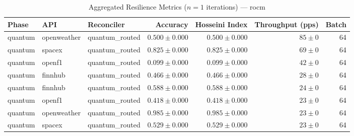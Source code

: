 
\begin{table}[htbp]
\caption{Aggregated Resilience Metrics ($n=1$ iterations) --- rocm}
\begin{tabular}{l l l r r r r}
\hline
Phase & API & Reconciler & Accuracy & Hosseini Index & Throughput (pps) & Batch \\
\hline
quantum & openweather & quantum\_routed & $0.500\pm0.000$ & $0.500\pm0.000$ & $85\pm0$ & 64 \\
quantum & spacex & quantum\_routed & $0.825\pm0.000$ & $0.825\pm0.000$ & $69\pm0$ & 64 \\
quantum & openf1 & quantum\_routed & $0.099\pm0.000$ & $0.099\pm0.000$ & $42\pm0$ & 64 \\
quantum & finnhub & quantum\_routed & $0.466\pm0.000$ & $0.466\pm0.000$ & $28\pm0$ & 64 \\
quantum & finnhub & quantum\_routed & $0.588\pm0.000$ & $0.588\pm0.000$ & $24\pm0$ & 64 \\
quantum & openf1 & quantum\_routed & $0.418\pm0.000$ & $0.418\pm0.000$ & $23\pm0$ & 64 \\
quantum & openweather & quantum\_routed & $0.985\pm0.000$ & $0.985\pm0.000$ & $23\pm0$ & 64 \\
quantum & spacex & quantum\_routed & $0.529\pm0.000$ & $0.529\pm0.000$ & $23\pm0$ & 64 \\
\hline
\end{tabular}
\end{table}
